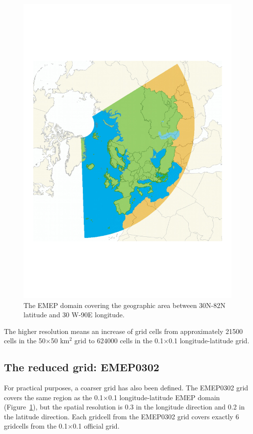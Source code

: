 \begin{figure}[h]
\centering
\includegraphics*[viewport=25 150 570 680,clip,scale=0.5]{FIGS_INTRO/lonlatgrid.pdf}
\caption{The EMEP domain covering the geographic area between 30\degrees N-82\degrees N latitude and 30\degrees 
W-90\degrees E longitude.}
\label{fig:lonlatgrid}
\end{figure}


The higher resolution means an increase of grid cells from approximately 
21500 cells in the 50$\times$50 km$^2$ grid to 624000 cells in the  {0.1\degrees $\times$0.1\degrees} longitude-latitude grid.

\subsection{The reduced grid: EMEP0302}

For practical purposes, a coarser grid has also been defined. The EMEP0302 grid covers the same region as the  {0.1\degrees $\times$0.1\degrees} longitude-latitude EMEP domain (Figure~\ref{fig:lonlatgrid}), but the spatial resolution is 0.3{\degrees} in the longitude direction and  0.2{\degrees} in the latitude direction. Each gridcell from the EMEP0302 grid covers exactly 6 gridcells from the {0.1\degrees $\times$0.1\degrees} official grid. %


